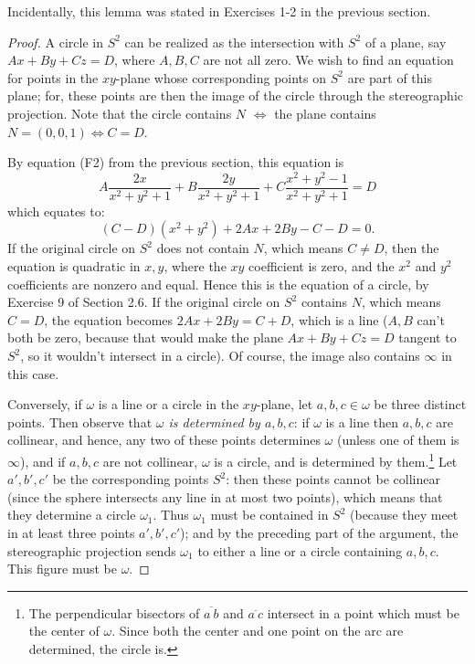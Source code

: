 \documentclass[leqno]{book}
\begin{document}
\noindent Incidentally, this lemma was stated in Exercises 1-2 in the previous section.
\begin{proof}
A circle in $S^2$ can be realized as the intersection with $S^2$ of a plane, say $Ax+By+Cz=D$, where $A,B,C$ are not all zero.  We wish to find an equation for points in the $xy$-plane whose corresponding points on $S^2$ are part of this plane; for, these points are then the image of the circle through the stereographic projection.  Note that the circle contains $N$ $\iff$ the plane contains $N=(0,0,1)\iff C=D$.

By equation (F2) from the previous section, this equation is
$$A\frac{2x}{x^2+y^2+1}+B\frac{2y}{x^2+y^2+1}+C\frac{x^2+y^2-1}{x^2+y^2+1}=D$$
which equates to:
$$(C-D)(x^2+y^2)+2Ax+2By-C-D=0.$$
If the original circle on $S^2$ does not contain $N$, which means $C\ne D$, then the equation is quadratic in $x,y$, where the $xy$ coefficient is zero, and the $x^2$ and $y^2$ coefficients are nonzero and equal.  Hence this is the equation of a circle, by Exercise 9 of Section 2.6.  If the original circle on $S^2$ contains $N$, which means $C=D$, the equation becomes $2Ax+2By=C+D$, which is a line ($A,B$ can't both be zero, because that would make the plane $Ax+By+Cz=D$ tangent to $S^2$, so it wouldn't intersect in a circle).  Of course, the image also contains $\infty$ in this case.

Conversely, if $\omega$ is a line or a circle in the $xy$-plane, let $a,b,c\in\omega$ be three distinct points.  Then observe that \emph{$\omega$ is determined by $a,b,c$}: if $\omega$ is a line then $a,b,c$ are collinear, and hence, any two of these points determines $\omega$ (unless one of them is $\infty$), and if $a,b,c$ are not collinear, $\omega$ is a circle, and is determined by them.\footnote{The perpendicular bisectors of $\overline{a~b}$ and $\overline{a~c}$ intersect in a point which must be the center of $\omega$.  Since both the center and one point on the arc are determined, the circle is.}  Let $a',b',c'$ be the corresponding points $S^2$: then these points cannot be collinear (since the sphere intersects any line in at most two points), which means that they determine a circle $\omega_1$.  Thus $\omega_1$ must be contained in $S^2$ (because they meet in at least three points $a',b',c'$); and by the preceding part of the argument, the stereographic projection sends $\omega_1$ to either a line or a circle containing $a,b,c$.  This figure must be $\omega$.
\end{proof}
\end{document}
